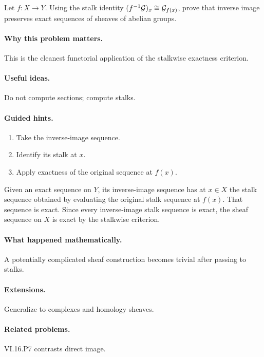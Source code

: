\begin{problem}\label{prob:vi16-p08}
Let $f:X\to Y$.  Using the stalk identity $(f^{-1}\mathcal G)_x\cong\mathcal G_{f(x)}$, prove that inverse image preserves exact sequences of sheaves of abelian groups.
\end{problem}

\ifdefined\FullProblemDossiers
\paragraph{Why this problem matters.}
This is the cleanest functorial application of the stalkwise exactness criterion.

\paragraph{Useful ideas.}
Do not compute sections; compute stalks.

\paragraph{Guided hints.}
\begin{enumerate}
\item Take the inverse-image sequence.
\item Identify its stalk at $x$.
\item Apply exactness of the original sequence at $f(x)$.
\end{enumerate}

\begin{solution}
Given an exact sequence on $Y$, its inverse-image sequence has at $x\in X$ the stalk sequence obtained by evaluating the original stalk sequence at $f(x)$.  That sequence is exact.  Since every inverse-image stalk sequence is exact, the sheaf sequence on $X$ is exact by the stalkwise criterion.
\end{solution}

\paragraph{What happened mathematically.}
A potentially complicated sheaf construction becomes trivial after passing to stalks.

\paragraph{Extensions.}
Generalize to complexes and homology sheaves.

\paragraph{Related problems.}
VI.16.P7 contrasts direct image.
\fi
